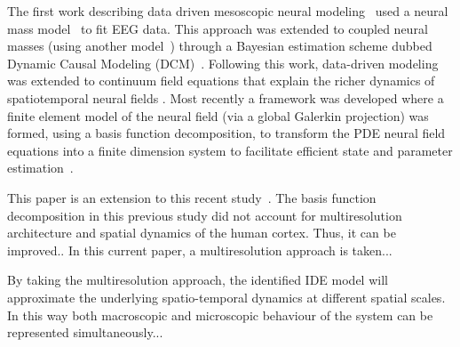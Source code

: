 \documentclass[journal,a4paper]{IEEEtran}
\begin{document}
The first work describing data driven mesoscopic neural modeling~\cite{Valdes1999} used a neural mass model~\cite{LopesDaSilva1976,Zetterberg1978} to fit EEG data. This approach was extended to coupled neural masses (using another model~\cite{Jansen1995}) through a Bayesian estimation scheme dubbed Dynamic Causal Modeling (DCM)~\cite{David2003}. Following this work, data-driven modeling was extended to continuum field equations that explain the richer dynamics of spatiotemporal neural fields \cite{Galka2008,schiff2008kalman,Daunizeau2009}. Most recently a framework was developed where a finite element model of the neural field (via a global Galerkin projection) was formed, using a basis function decomposition, to transform the PDE neural field equations into a finite dimension system to facilitate efficient state and parameter estimation~\cite{Freestone2011}.  

This paper is an extension to this recent study~\cite{Freestone2011}. The basis function decomposition in this previous study did not account for multiresolution architecture and spatial dynamics of the human cortex. Thus, it can be improved.. In this current paper, a multiresolution approach is taken...

By taking the multiresolution approach, the identified IDE model will approximate the underlying spatio-temporal dynamics at different spatial scales. In this way both macroscopic and microscopic behaviour of the system can be represented simultaneously...
\end{document}
